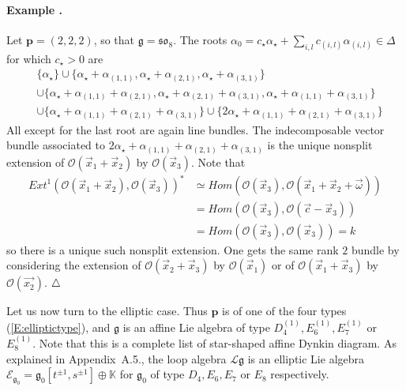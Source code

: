 \documentclass[a4paper,10pt]{amsart}
\def\endexample{$\hfill \triangle$}
\def\a{\alpha}
\def\O{\mathcal{O}}
\def\p{\mathbf{p}}
\def\g{\mathfrak{g}}
\numberwithin{equation}{section}
\begin{document}
{\paragraph{\textbf{Example \thetheo.}} Let $\p=(2,2,2)$, so that $\g=\mathfrak{so}_8$. The roots
$\a_0= c_{\star}\a_{\star} +\sum_{i,l} c_{(i,l)}\a_{(i,l)}\in \Delta$ for which $c_{\star}>0$ are
\begin{equation*}
\begin{split}
&\{\a_{\star}\} \cup \{\a_{\star}+\a_{(1,1)}, \a_{\star}+\a_{(2,1)},\a_{\star}+\a_{(3,1)}\} \\
&\cup \{\a_{\star}+\a_{(1,1)}+\a_{(2,1)}, \a_{\star}+\a_{(2,1)}+\a_{(3,1)},\a_{\star}+\a_{(1,1)}+\a_{(3,1)}\}\\
&\cup \{\a_{\star}+\a_{(1,1)}+\a_{(2,1)}+\a_{(3,1)}\} \cup \{2\a_{\star}+\a_{(1,1)}+\a_{(2,1)}+\a_{(3,1)}\}
\end{split}
\end{equation*}
All except for the last root are again line bundles. The indecomposable vector bundle associated to
$2\a_{\star}+\a_{(1,1)}+\a_{(2,1)}+\a_{(3,1)}$ is the unique nonsplit extension of $\O(\vec{x}_1+\vec{x}_2)$ by $\O(\vec{x}_3)$. Note that
\begin{equation*}
\begin{split}
{Ext}^1(\O(\vec{x}_1+\vec{x}_2),\O(\vec{x}_3))^* &\simeq {Hom}(\O(\vec{x}_3),\O(\vec{x}_1+\vec{x}_2 +\vec{\omega}))\\
&={Hom}(\O(\vec{x}_3),\O(\vec{c}-\vec{x}_3))\\
&={Hom}(\O(\vec{x}_3),\O(\vec{x}_3))=k
\end{split}
\end{equation*}
so there is a unique such nonsplit extension. One gets the same rank $2$ bundle by considering the extension of $\O(\vec{x}_2+\vec{x}_3)$ by $\O(\vec{x}_1)$ or of $\O(\vec{x}_1+\vec{x}_3)$ by $\O(\vec{x_2})$.
\endexample

\vspace{.15in}

Let us now turn to the elliptic case. Thus $\p$ is of one of the four types (\ref{E:elliptictype}), and $\g$ is an affine Lie algebra of type $D_4^{(1)},E_6^{(1)},E_7^{(1)}$ or $E_8^{(1)}$. Note that this is a complete list of star-shaped affine Dynkin diagram. As explained in Appendix~A.5., the loop algebra $\mathcal{L}\g$ is an elliptic Lie algebra $\mathcal{E}_{\g_0}=\g_0[t^{\pm 1},s^{\pm 1}] \oplus \mathbb{K}$ for $\g_0$ of type $D_4, E_6,E_7$ or $E_8$ respectively.

\vspace{.15in}

}
\end{document}
